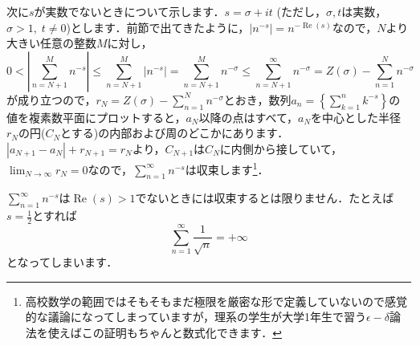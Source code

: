 \documentclass[./main]{subfile}
\begin{document}
次に$s$が実数でないときについて示します．$s=\sigma +it$ (ただし，$\sigma,t$は実数，$\sigma>1,\;t\neq 0$)とします．前節で出てきたように，$|n^{-s}|=n^{-\operatorname{Re}(s)}$なので，$N$より大きい任意の整数$M$に対し，
\[
0<\left|\sum_{n=N+1}^{M}n^{-s}\right|\leq\sum_{n=N+1}^{M}\left|n^{-s}\right|=\sum_{n=N+1}^{M}n^{-\sigma}\leq\sum_{n=N+1}^{\infty}n^{-\sigma}=Z(\sigma)-\sum_{n=1}^{N}n^{-\sigma}
\]
が成り立つので，$r_N=Z(\sigma)-\sum_{n=1}^{N}n^{-\sigma}$とおき，数列${a_n}=\left\{\sum_{k=1}^nk^{-s}\right\}$の値を複素数平面にプロットすると，$a_N$以降の点はすべて，$a_N$を中心とした半径$r_N$の円($C_N$とする)の内部および周のどこかにあります．$|a_{N+1}-a_N|+r_{N+1}=r_N$より，$C_{N+1}$は$C_N$に内側から接していて，$\lim_{N\to\infty}r_N=0$なので，$\sum_{n=1}^{\infty}n^{-s}$は収束します\footnote{高校数学の範囲ではそもそもまだ極限を厳密な形で定義していないので感覚的な議論になってしまっていますが，理系の学生が大学1年生で習う$\epsilon-\delta$論法を使えばこの証明もちゃんと数式化できます．}．

$\sum_{n=1}^{\infty}n^{-s}$は$\operatorname{Re}(s)>1$でないときには収束するとは限りません．たとえば$s=\frac{1}{2}$とすれば
\[
\sum_{n=1}^{\infty}\frac{1}{\sqrt{n}}=+\infty
\]
となってしまいます．
\end{document}
